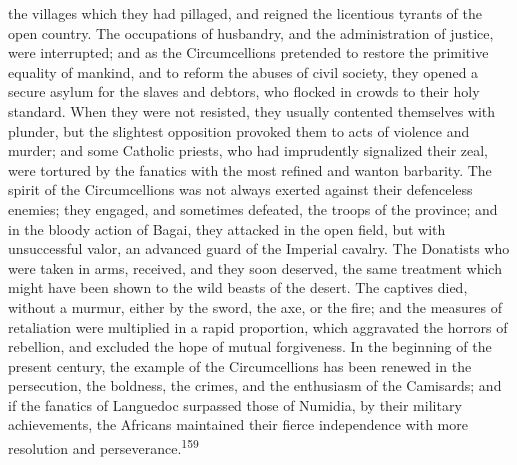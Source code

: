 the villages which they had pillaged, and reigned the licentious
tyrants of the open country. The occupations of husbandry, and
the administration of justice, were interrupted; and as the
Circumcellions pretended to restore the primitive equality of
mankind, and to reform the abuses of civil society, they opened a
secure asylum for the slaves and debtors, who flocked in crowds
to their holy standard. When they were not resisted, they usually
contented themselves with plunder, but the slightest opposition
provoked them to acts of violence and murder; and some Catholic
priests, who had imprudently signalized their zeal, were tortured
by the fanatics with the most refined and wanton barbarity. The
spirit of the Circumcellions was not always exerted against their
defenceless enemies; they engaged, and sometimes defeated, the
troops of the province; and in the bloody action of Bagai, they
attacked in the open field, but with unsuccessful valor, an
advanced guard of the Imperial cavalry. The Donatists who were
taken in arms, received, and they soon deserved, the same
treatment which might have been shown to the wild beasts of the
desert. The captives died, without a murmur, either by the sword,
the axe, or the fire; and the measures of retaliation were
multiplied in a rapid proportion, which aggravated the horrors of
rebellion, and excluded the hope of mutual forgiveness. In the
beginning of the present century, the example of the
Circumcellions has been renewed in the persecution, the boldness,
the crimes, and the enthusiasm of the Camisards; and if the
fanatics of Languedoc surpassed those of Numidia, by their
military achievements, the Africans maintained their fierce
independence with more resolution and perseverance.\textsuperscript{159}



